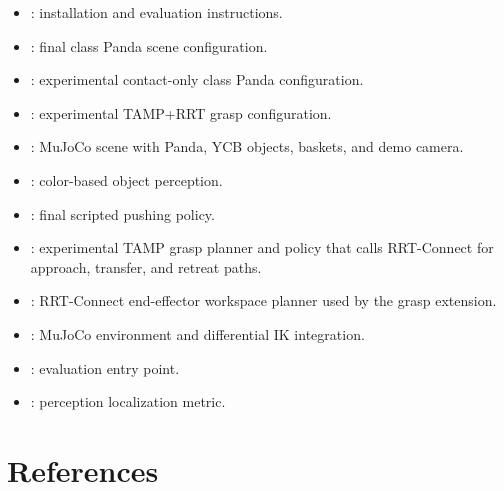 \documentclass{article}
\begin{document}
\begin{itemize}
  \item {}: installation and evaluation instructions.
  \item {}: final class Panda scene configuration.
  \item {}: experimental contact-only class Panda configuration.
  \item {}: experimental TAMP+RRT grasp configuration.
  \item {}: MuJoCo scene with Panda, YCB objects, baskets, and demo camera.
  \item {}: color-based object perception.
  \item {}: final scripted pushing policy.
  \item {}: experimental TAMP grasp planner and policy that calls RRT-Connect for approach, transfer, and retreat paths.
  \item {}: RRT-Connect end-effector workspace planner used by the grasp extension.
  \item {}: MuJoCo environment and differential IK integration.
  \item {}: evaluation entry point.
  \item {}: perception localization metric.
\end{itemize}

\section{References}
\end{document}

